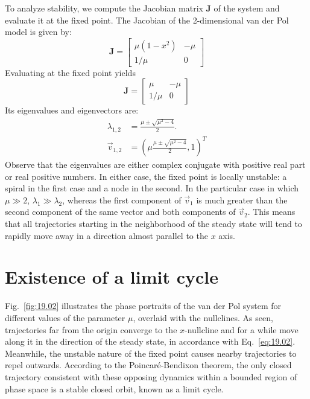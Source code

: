 To analyze stability, we compute the Jacobian matrix $\mathbf{J}$ of the system and evaluate it at the fixed point. The Jacobian of the 2-dimensional van der Pol model is given by:
\begin{equation*}
    \mathbf{J} = \begin{bmatrix}
        \mu (1 - x^2) & -\mu \\
        1/\mu & 0
    \end{bmatrix}
\end{equation*}
Evaluating at the fixed point yields
\begin{equation*}
    \mathbf{J} = \begin{bmatrix}
        \mu & -\mu \\
        1/\mu & 0
    \end{bmatrix}
\end{equation*}
Its eigenvalues and eigenvectors are:
\begin{align*}
    \lambda_{1,2} & = \frac{\mu \pm \sqrt{\mu^2 - 4}}{2}. \\
    \vec{v}_{1,2} & = \left( \mu \frac{\mu \pm \sqrt{\mu^2 - 4}}{2}, 1 \right)^T
\end{align*}
Observe that the eigenvalues are either complex conjugate with positive real part or real positive numbers. In either case, the fixed point is locally unstable: a spiral in the first case and a node in the second. In the particular case in which $\mu \gg 2$, $\lambda_1 \gg \lambda_2$, whereas the first component of $\vec{v}_1$ is much greater than the second component of the same vector and both components of $\vec{v}_2$. This means that all trajectories starting in the neighborhood of the steady state will tend to rapidly move away in a direction almost parallel to the $x$ axis.

\section{Existence of a limit cycle}

Fig.~\ref{fig:19.02} illustrates the phase portraits of the van der Pol system for different values of the parameter $\mu$, overlaid with the nullclines. As seen, trajectories far from the origin converge to the $x$-nullcline and for a while move along it in the direction of the steady state, in accordance with Eq.~\eqref{eq:19.02}. Meanwhile, the unstable nature of the fixed point causes nearby trajectories to repel outwards. According to the Poincaré-Bendixon theorem, the only closed trajectory consistent with these opposing dynamics within a bounded region of phase space is a stable closed orbit, known as a limit cycle.

